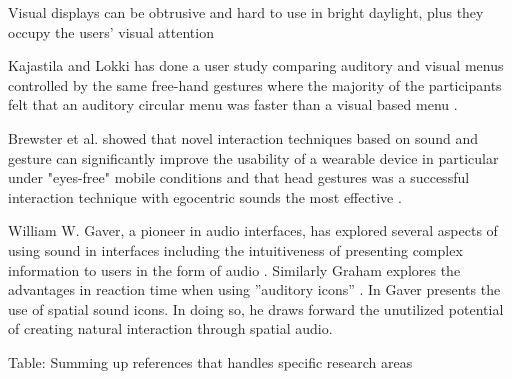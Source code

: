 Visual displays can be obtrusive and hard to use in bright daylight, plus they occupy the users’ visual attention \cite{geelhoed_safety_2000}

Kajastila and Lokki has done a user study comparing auditory and visual menus controlled by the same free-hand gestures where the majority of the participants felt that an auditory circular menu was faster than a visual based menu \cite{kajastila_interaction_2013}.

Brewster et al. showed that novel interaction techniques based on sound and gesture can significantly improve the usability of a wearable device in particular under "eyes-free" mobile conditions and that head gestures was a successful interaction technique with egocentric sounds the most effective \cite{brewster_multimodaleyes-freeinteraction_2003}.

William W. Gaver, a pioneer in audio interfaces, has explored several aspects of using sound in interfaces including the intuitiveness of presenting complex information to users in the form of audio \cite{gaver_sonicfinder:_1989}. Similarly Graham explores the advantages in reaction time when using ”auditory icons” \cite{graham_use_1999}. In \cite{gaver_auditory_1986} Gaver presents the use of spatial sound icons. In doing so, he draws forward the unutilized potential of creating natural interaction through spatial audio.

Table: Summing up references that handles specific research areas





